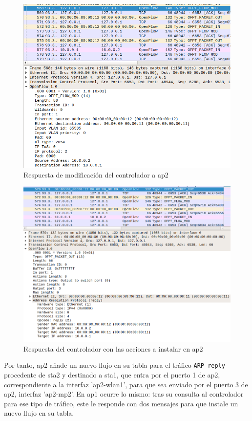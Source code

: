 \documentclass[a4paper,12pt,twoside,spanish]{book}
\begin{document}
	\begin{figure}[!h]
		\centering
		\includegraphics[scale=0.41]{Figuras/capt_4.png}
		\caption{Respuesta de modificación del controlador a ap2}
		\label{fig:capt_4}
	\end{figure}
	
	\begin{figure}[!h]
		\centering
		\includegraphics[scale=0.4]{Figuras/capt_5.png}
		\caption{Respuesta del controlador con las acciones a instalar en ap2}
		\label{fig:capt_5}
	\end{figure}

Por tanto, ap2 añade un nuevo flujo en su tabla para el tráfico \texttt{ARP reply} procedente de sta2 y destinado a sta1, que entra por el puerto 1 de ap2, correspondiente a la interfaz 'ap2-wlan1', para que sea enviado por el puerto 3 de ap2, interfaz 'ap2-mp2'. En ap1 ocurre lo mismo: tras su consulta al controlador para ese tipo de tráfico, este le responde con dos mensajes para que instale un nuevo flujo en su tabla.\par 
\end{document}
